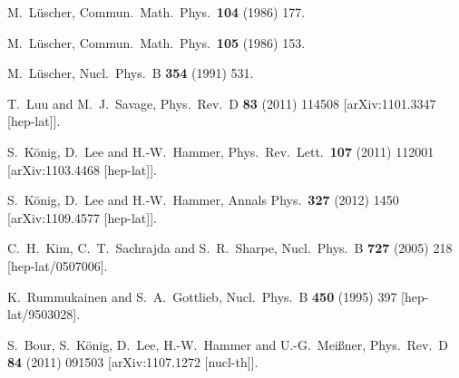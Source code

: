 \documentclass[aps,singlecolumn,superscriptaddress,nofootinbib,tightenlines,
preprintnumbers,showkeys]{revtex4-1}
\begin{document}
\begin{thebibliography}{99}

  M.~Lüscher,
  Commun.\ Math.\ Phys.\ {\bf 104} (1986) 177.

  M.~L{\"u}scher,
  Commun.\ Math.\ Phys.\ {\bf 105} (1986) 153.

  M.~Lüscher,
  Nucl.\ Phys.\ B {\bf 354} (1991) 531.

  T.~Luu and M.~J.~Savage,
  Phys.\ Rev.\ D {\bf 83} (2011) 114508
  [arXiv:1101.3347 [hep-lat]].

  S.~König, D.~Lee and H.-W.~Hammer,
  Phys.\ Rev.\ Lett.\ {\bf 107} (2011) 112001
  [arXiv:1103.4468 [hep-lat]].

  S.~König, D.~Lee and H.-W.~Hammer,
  Annals Phys.\ {\bf 327} (2012) 1450
  [arXiv:1109.4577 [hep-lat]].

  C.~H.~Kim, C.~T.~Sachrajda and S.~R.~Sharpe,
  Nucl.\ Phys.\ B {\bf 727} (2005) 218
  [hep-lat/0507006].

  K.~Rummukainen and S.~A.~Gottlieb,
  Nucl.\ Phys.\ B {\bf 450} (1995) 397
  [hep-lat/9503028].

  S.~Bour, S.~König, D.~Lee, H.-W.~Hammer and U.-G.~Mei{\ss}ner,
  Phys.\ Rev.\ D {\bf 84} (2011) 091503
  [arXiv:1107.1272 [nucl-th]].


\end{thebibliography}
\end{document}
